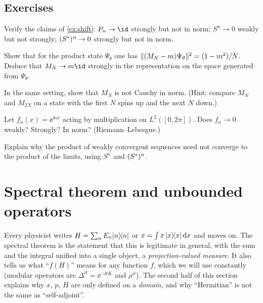 \subsection*{Exercises}
\begin{exercise}\label{ex:topologies:1}
Verify the claims of \cref{ex:shift}: $P_n\to\id$ strongly but not in norm; $S^n\to0$ weakly but not strongly; $(S^{*})^n\to0$ strongly but not in norm.
\end{exercise}
\begin{exercise}\label{ex:topologies:2}
Show that for the product state $\Psi_\theta$ one has $\lVert (M_N-m)\Psi_\theta\rVert^2=(1-m^2)/N$. Deduce that $M_N\to m\id$ strongly in the representation on the space generated from $\Psi_\theta$.
\end{exercise}
\begin{exercise}\label{ex:topologies:3}
In the same setting, show that $M_N$ is not Cauchy in norm. (Hint: compare $M_N$ and $M_{2N}$ on a state with the first $N$ spins up and the next $N$ down.)
\end{exercise}
\begin{exercise}\label{ex:topologies:4}
Let $f_n(x)=\ee^{\ii nx}$ acting by multiplication on $L^2([0,2\pi])$. Does $f_n\to0$ weakly? Strongly? In norm? (Riemann--Lebesgue.)
\end{exercise}
\begin{exercise}\label{ex:topologies:5}
Explain why the product of weakly convergent sequences need not converge to the product of the limits, using $S^n$ and $(S^{*})^n$.
\end{exercise}

\section{Spectral theorem and unbounded operators}\label{ch:spectral}

\mshift{164mm}\begin{physmotiv}
Every physicist writes $H=\sum_nE_n\lvert n\rangle\!\langle n\rvert$ or $x=\int x\,\lvert x\rangle\!\langle x\rvert\,\mathrm{d} x$ and moves on. The spectral theorem is the statement that this is legitimate in general, with the sum and the integral unified into a single object, a \emph{projection-valued measure}. It also tells us what ``$f(H)$'' means for any function $f$, which we will use constantly (modular operators are $\Delta^{it}=\ee^{-\ii tK}$ and $\rho^{it}$). The second half of this section explains why $x$, $p$, $H$ are only defined on a \emph{domain}, and why ``Hermitian'' is not the same as ``self-adjoint''.
\end{physmotiv}

